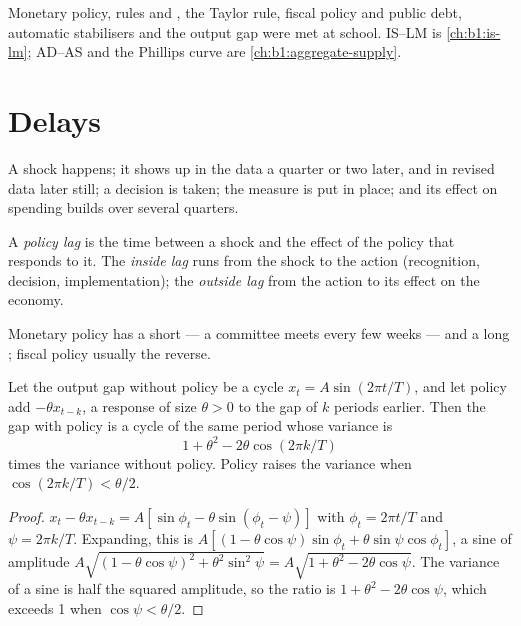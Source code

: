 \begin{recall}
Monetary policy, rules and , the Taylor rule, fiscal policy and
public debt, automatic stabilisers and the output gap were met at school.
IS--LM is \cref{ch:b1:is-lm}; AD--AS and the Phillips curve are
\cref{ch:b1:aggregate-supply}.
\end{recall}

\section{Delays}\label{sec:b1:stabilisation-policy:lags}

A shock happens; it shows up in the data a quarter or two later, and in
revised data later still; a decision is taken; the measure is put in
place; and its effect on spending builds over several quarters.

\begin{definition}\label{def:b1:stabilisation-policy:lags}
A \emph{policy lag} is the time between a shock and the effect of the policy
that responds to it. The \emph{inside lag} runs from the shock to the action
(recognition, decision, implementation); the \emph{outside lag} from the
action to its effect on the economy.
\end{definition}

Monetary policy has a short  --- a committee meets every few
weeks --- and a long ; fiscal policy usually the reverse.

\begin{proposition}\label{prop:b1:stabilisation-policy:cycle}
Let the output gap without policy be a cycle $x_t = A\sin(2\pi t/T)$, and let policy add
$-\theta x_{t-k}$, a response of size $\theta > 0$ to the gap of $k$ periods earlier. Then the gap
with policy is a cycle of the same period whose variance is
\[
1 + \theta^2 - 2\theta\cos(2\pi k/T)
\]
times the variance without policy. Policy raises the variance when $\cos(2\pi k/T) < \theta/2$.
\end{proposition}

\begin{proof}
$x_t - \theta x_{t-k} = A[\sin\phi_t - \theta\sin(\phi_t - \psi)]$ with $\phi_t = 2\pi t/T$ and $\psi = 2\pi k/T$. Expanding,
this is $A[(1 - \theta\cos\psi)\sin\phi_t + \theta\sin\psi\cos\phi_t]$, a sine of amplitude
$A\sqrt{(1 - \theta\cos\psi)^2 + \theta^2\sin^2\psi} = A\sqrt{1 + \theta^2 - 2\theta\cos\psi}$. The variance of a sine is half the
squared amplitude, so the ratio is $1 + \theta^2 - 2\theta\cos\psi$, which exceeds 1 when $\cos\psi < \theta/2$.
\end{proof}

